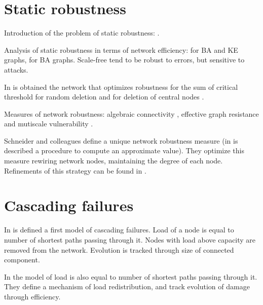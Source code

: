 \documentclass[12pt]{article}
\begin{document}
\section{Static robustness}

Introduction of the problem of static robustness: \cite{Albert2000}. \medskip

Analysis of static robustness in terms of network efficiency: \cite{Crucitti2003}  for BA and KE graphs, \cite{Crucitti2004b} for BA graphs. Scale-free tend to be robust to errors, but sensitive to attacks. \medskip

In \cite{Paul2005} is obtained the network that optimizes robustness for the sum of critical threshold for random deletion \cite{Cohen2000a} and for deletion of central nodes \cite{Cohen2001a}. \medskip

Measures of network robustness: algebraic connectivity \cite{Fiedler1973}, effective graph resistance \cite{Ellens2011} and mutiscale vulnerability \cite{Boccaletti2007}.\medskip

Schneider and colleagues \cite{Schneider2011} define a unique network robustness measure (in \cite{Honng2017} is described a procedure to compute an approximate value). They optimize this measure rewiring network nodes, maintaining the degree of each node. Refinements of this strategy can be found in \cite{Louzada2013, Yang2015, Zhou2014}.


\section{Cascading failures}

In \cite{Motter2002} is defined a first model of cascading failures. Load of a node is equal to number of shortest paths passing through it. Nodes with load above capacity are removed from the network. Evolution is tracked through size of connected component. \medskip

In the model of \cite{Crucitti2004} load is also equal to number of shortest paths passing through it. They define a mechanism of load redistribution, and track evolution of damage through efficiency. \medskip

\nocite{*}



\end{document}
